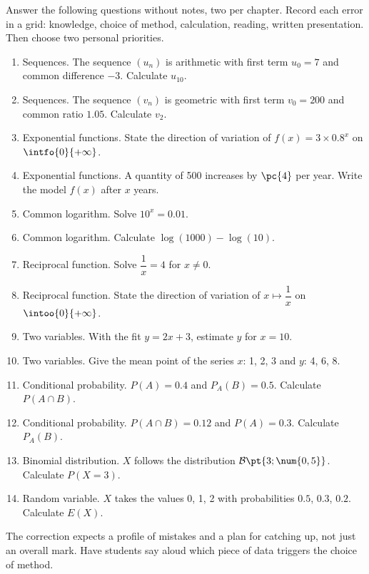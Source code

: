 \begin{activity}
Answer the following  questions without notes, two per chapter. Record each error in a grid: knowledge, choice of method, calculation, reading, written presentation. Then choose two personal priorities.
\begin{enumerate}
\item Sequences. The sequence $(u_n)$ is arithmetic with first term $u_0=7$ and common difference $-3$. Calculate $u_{10}$. 
\item Sequences. The sequence $(v_n)$ is geometric with first term $v_0=200$ and common ratio $\num{1,05}$. Calculate $v_2$. 
\item Exponential functions. State the direction of variation of $f(x)=3\times\num{0,8}^x$ on $\intfo{0}{+\infty}$. 
\item Exponential functions. A quantity of 500 increases by $\pc{4}$ per year. Write the model $f(x)$ after $x$ years. 
\item Common logarithm. Solve $10^x=\num{0,01}$. 
\item Common logarithm. Calculate $\log(1000)-\log(10)$. 
\item Reciprocal function. Solve $\dfrac1x=4$ for $x\neq0$. 
\item Reciprocal function. State the direction of variation of $x\mapsto\dfrac1x$ on $\intoo{0}{+\infty}$. 
\item Two variables. With the fit $y=2x+3$, estimate $y$ for $x=10$. 
\item Two variables. Give the mean point of the series $x$: 1, 2, 3 and $y$: 4, 6, 8. 
\item Conditional probability. $P(A)=\num{0,4}$ and $P_A(B)=\num{0,5}$. Calculate $P(A\cap B)$. 
\item Conditional probability. $P(A\cap B)=\num{0,12}$ and $P(A)=\num{0,3}$. Calculate $P_A(B)$. 
\item Binomial distribution. $X$ follows the distribution $\mathcal B\pt{3;\num{0,5}}$. Calculate $P(X=3)$. 
\item Random variable. $X$ takes the values 0, 1, 2 with probabilities $\num{0,5}$, $\num{0,3}$, $\num{0,2}$. Calculate $E(X)$. 
\end{enumerate}

\end{activity}
\begin{solution}The correction expects a profile of mistakes and a plan for catching up, not just an overall mark. Have students say aloud which piece of data triggers the choice of method.\end{solution}

